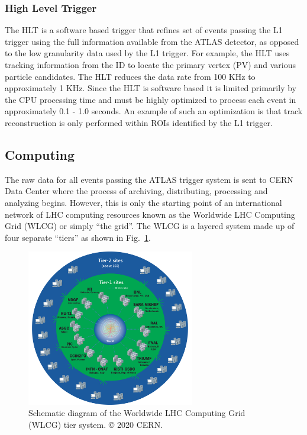 \subsubsection{High Level Trigger}
The HLT is a software based trigger that refines set of events passing the L1 trigger using the full information available from the ATLAS detector, as opposed to the low granularity data used by the L1 trigger.
For example, the HLT uses tracking information from the ID to locate the primary vertex (PV)  and various particle candidates.
The HLT reduces the data rate from 100 KHz to approximately 1 KHz.
Since the HLT is software based it is limited primarily by the CPU processing time and must be highly optimized to process each event in approximately 0.1 - 1.0 seconds.
An example of such an optimization is that track reconstruction  is only performed within ROIs identified by the L1 trigger.

\subsection{Computing}
The raw data for all events passing the ATLAS trigger system is sent to CERN Data Center where the process of archiving, distributing, processing and analyzing begins.
However, this is only the starting point of an international network of LHC computing resources \cite{Bird:1447125} known as the Worldwide LHC Computing Grid (WLCG) or simply ``the grid''.
The WLCG is a layered system made up of four separate ``tiers'' as shown in Fig.~\ref{fig:wlcg_tiers}.

\begin{figure}
	\centering
	\includegraphics[width=0.65\textwidth]{wlcg_tiers}
	\caption{Schematic diagram of the Worldwide LHC Computing Grid (WLCG) tier system. © 2020 CERN.}
	\label{fig:wlcg_tiers}
\end{figure}

